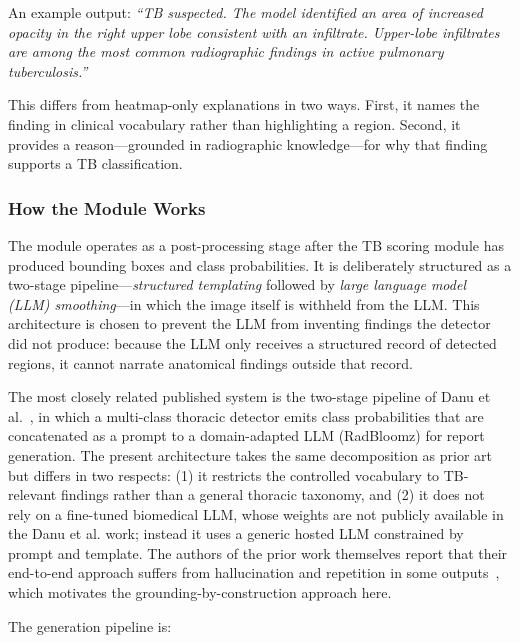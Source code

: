 \documentclass[conference, letterpaper]{IEEEtran}
\begin{document}
An example output: \textit{``TB suspected. The model identified an area of increased opacity in the right upper lobe consistent with an infiltrate. Upper-lobe infiltrates are among the most common radiographic findings in active pulmonary tuberculosis.''}

This differs from heatmap-only explanations in two ways. First, it names the finding in clinical vocabulary rather than highlighting a region. Second, it provides a reason---grounded in radiographic knowledge---for why that finding supports a TB classification.

\subsubsection{How the Module Works}

The module operates as a post-processing stage after the TB scoring module has produced bounding boxes and class probabilities. It is deliberately structured as a two-stage pipeline---\emph{structured templating} followed by \emph{large language model (LLM) smoothing}---in which the image itself is withheld from the LLM. This architecture is chosen to prevent the LLM from inventing findings the detector did not produce: because the LLM only receives a structured record of detected regions, it cannot narrate anatomical findings outside that record.

The most closely related published system is the two-stage pipeline of Danu et al.~\cite{siemens_llm_cxr_2023}, in which a multi-class thoracic detector emits class probabilities that are concatenated as a prompt to a domain-adapted LLM (RadBloomz) for report generation. The present architecture takes the same decomposition as prior art but differs in two respects: (1) it restricts the controlled vocabulary to TB-relevant findings rather than a general thoracic taxonomy, and (2) it does not rely on a fine-tuned biomedical LLM, whose weights are not publicly available in the Danu et al. work; instead it uses a generic hosted LLM constrained by prompt and template. The authors of the prior work themselves report that their end-to-end approach suffers from hallucination and repetition in some outputs~\cite{siemens_llm_cxr_2023}, which motivates the grounding-by-construction approach here.

The generation pipeline is:
\end{document}
